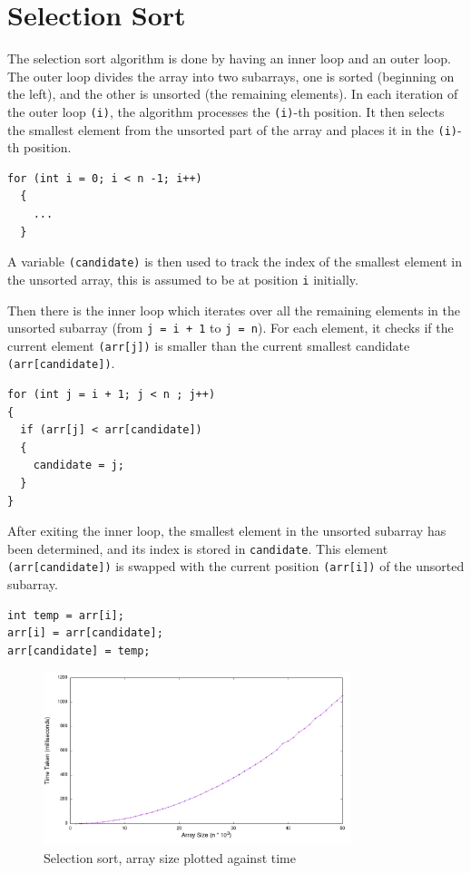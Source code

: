 \documentclass[a4paper,11pt]{article}
\begin{document}
\section*{Selection Sort}

The selection sort algorithm is done by having an inner loop and an outer loop.
The outer loop divides the array into two subarrays, one is sorted (beginning on the left),
and the other is unsorted (the remaining elements).
In each iteration of the outer loop \texttt{(i)}, the algorithm processes the \texttt{(i)}-th position.
It then selects the smallest element from the unsorted part of the array and places it in the \texttt{(i)}-th position.

\begin{verbatim}
for (int i = 0; i < n -1; i++)
  {
    ...
  }
\end{verbatim}

A variable \texttt{(candidate)} is then used to track the index of the smallest element in the unsorted array,
this is assumed to be at position \texttt{i} initially.

Then there is the inner loop which iterates over all the remaining elements in the unsorted subarray (from \texttt{j = i + 1} to \texttt{j = n}).
For each element, it checks if the current element \texttt{(arr[j])} is smaller than the current smallest candidate \texttt{(arr[candidate])}.

\begin{verbatim}
for (int j = i + 1; j < n ; j++)
{
  if (arr[j] < arr[candidate])
  {
    candidate = j;
  }
}
\end{verbatim}

After exiting the inner loop, the smallest element in the unsorted subarray has been determined,
and its index is stored in \texttt{candidate}.
This element \texttt{(arr[candidate])} is swapped with the current position \texttt{(arr[i])} of the unsorted subarray.

\begin{verbatim}
int temp = arr[i];
arr[i] = arr[candidate];
arr[candidate] = temp;
\end{verbatim}

\begin{figure}[h!]
  \centering
  \includegraphics[width=0.8\textwidth]{SelectionSort_plot}
  \caption{Selection sort, array size plotted against time}
  \label{fig:SelectionSort_plot}
\end{figure}
\end{document}
